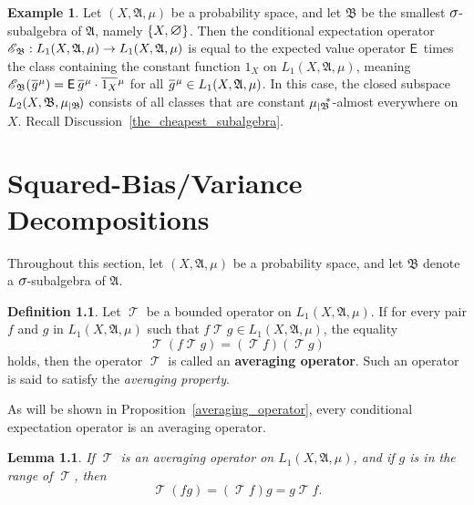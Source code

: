 \documentclass[
twoside=true,
paper=letter,
fontsize=9pt,
pagesize=auto,
leqno,
openany,
headsepline,
overfullrule,
]{scrbook}
\theoremstyle{plain}
\theoremstyle{plain}
\newtheorem{lemma}[thm]{Lemma}
\theoremstyle{definition}
\newtheorem{defn}[thm]{Definition}
\newtheorem{example}[thm]{Example}
\theoremstyle{bfnoteitalic}
\theoremstyle{bfnoteroman}
\newcommand{\term}[1]{\textbf{#1}\index{#1}}
\newcommand{\sigalg}[1]{\mathfrak{#1}}
\newcommand{\cali}[1]{\mathscr{#1}}
\newcommand{\sfop}[1]{\mathsf{#1}}
\newcommand{\expval}{\sfop{E}\,}
\newcommand{\condexpop}[1]{\mathop{\cali{E}\hspace{-1pt}}\nolimits_{#1}}
\newcommand{\textsigma}{\hbox{\large{$\sigma$}}\kern-1pt}
\newcommand{\restrictedto}[1]{_{\lvert#1}\kern-1.5pt}
\newcommand{\mtset}{\hbox{\large{$\varnothing$}}}
\newcommand{\sigmaalgebra}{\sigalg{A}}
\newcommand{\sigmaalgebraii}{\sigalg{B}}
\newcommand{\Psubstar}[1]{\measure\restrictedto{#1}\kern-2pt^*}
\newcommand{\Lone}{L_1(\measurespace, \sigmaalgebra, \measure)}
\newcommand{\OpT}{\mathop{\cali T}}
\newcommand{\oneonomega}{1_\measurespace}
\newcommand{\sigalgb}{\sigmaalgebraii}
\newcommand{\function}{f}
\newcommand{\functionii}{g}
\newcommand{\measurespace}{X}
\newcommand{\measure}{\mu}
\newcommand*\xbar[1]{%
   \hbox{%
     \vbox{%
       \hrule height 0.4pt %
       \kern0.4ex%
       \hbox{%
         \ensuremath{#1}%
       }%
     }%
   }%
}
\newcommand{\lebclass}[1]{\hspace{.5pt}\xbar{#1}\hspace{0.5pt}}
\newcommand{\ellclass}[2]{\lebclass{#1}^{#2}}
\begin{document}
\begin{example}
Let $(\measurespace, \sigmaalgebra,\measure)$ be a  probability space, and let 
$\sigmaalgebraii$ be the smallest $\textsigma$-subalgebra of $\sigmaalgebra$, namely $\{\measurespace, \mtset\}$.
Then the conditional expectation operator 
$\condexpop{\sigmaalgebraii} :\Lone\to\Lone$ is equal to the expected value operator $\expval$ times the class containing the constant function $\oneonomega$
on
$\Lone$, meaning
$\condexpop{\sigmaalgebraii}(\ellclass{\functionii}{\measure}) 
= \expval{\ellclass{\functionii}{\measure}}\cdot\ellclass{\oneonomega}{\measure}$
for all $\ellclass{\functionii}{\measure} \in \Lone$. In this case, the closed subspace $L_2(\measurespace, \sigmaalgebraii,\measure\restrictedto{\sigmaalgebraii})$ consists of all classes that are constant $\Psubstar{\sigalgb}$-almost everywhere on $\measurespace$. 
Recall Discussion~\ref{the_cheapest_subalgebra}.
\end{example}





\chapter[Squared-Bias/Variance]{Squared-Bias/Variance Decompositions}
%

Throughout this section, let $(\measurespace, \sigmaalgebra,\measure)$ be a  probability space, and let 
$\sigmaalgebraii$ denote a $\textsigma$-subalgebra of $\sigmaalgebra$.



\begin{defn}
Let $\OpT$ be a bounded operator on $\Lone$. If for every pair $\function$ and $\functionii$ in $\Lone$  such that $\function\OpT \functionii\in\Lone$, the equality
\[
\OpT(\function\OpT \functionii) = (\OpT \function)( \OpT \functionii)
\]
holds, then the operator $\OpT$ is called an \term{averaging operator}. Such an operator is said to satisfy the \emph{averaging property}.
\end{defn}


As will be shown in Proposition~\ref{averaging_operator}, every conditional expectation operator is an averaging operator.

\begin{lemma}\label{range_factors_out}
If $\OpT$ is an averaging operator on $\Lone$, and if $\functionii$ is in the range of $\OpT$, then 
\[
\OpT(\function\functionii) = (\OpT \function)\functionii = \functionii\OpT \function.
\]
\end{lemma}
\end{document}
